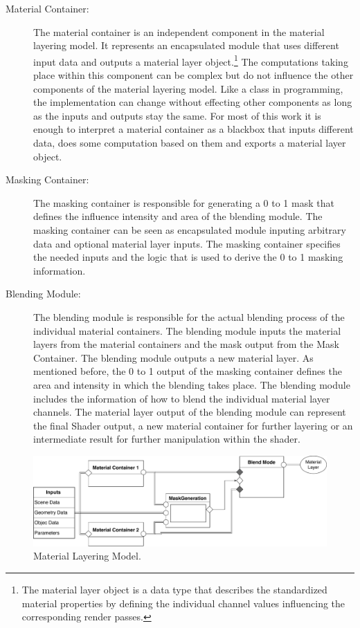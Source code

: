 \begin{description}
	\item[Material Container:]
		The material container is an independent component in the material layering model. It represents an encapsulated module that uses different input data and outputs a material layer object.\footnote{The material layer object is a data type that describes the standardized material properties by defining the individual channel values influencing the corresponding render passes.} The computations taking place within this component can be complex but do not influence the other components of the material layering model. Like a class in programming, the implementation can change without effecting other components as long as the inputs and outputs stay the same. For most of this work it is enough to interpret a material container as a blackbox that inputs different data, does some computation based on them and exports a material layer object. 
 
	\item[Masking Container:]
		The masking container is responsible for generating a 0 to 1 mask that defines the influence intensity and area of the blending module. The masking container can be seen as encapsulated module inputing arbitrary data and optional material layer inputs. The masking container specifies the needed inputs and the logic that is used to derive the 0 to 1 masking information. 
		
	\item[Blending Module:]
		The blending module is responsible for the actual blending process of the individual material containers. The blending module inputs the material layers from the material containers and the mask output from the Mask Container. The blending module outputs a new material layer. As mentioned before, the 0 to 1 output of the masking container defines the area and intensity in which the blending takes place. The blending module includes the information of how to blend the individual material layer channels. The material layer output of the blending module can represent the final Shader output, a new material container for further layering or an intermediate result for further manipulation within the shader. 
\end{description}

\begin{figure}
	\centering
	\includegraphics[width=0.95\linewidth]{images/04cha_01_LayeredMaterialComponents.pdf}
	\caption{Material Layering Model.}
	\label{fig:patternBasedMaterialModel}
\end{figure}

